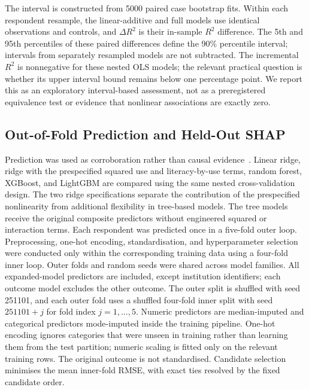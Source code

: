 \documentclass[sustainability,article,accept,moreauthors]{Definitions/mdpi}
\begin{document}
The interval is constructed from 5000 paired case bootstrap fits. Within each respondent resample, the linear-additive and full models use identical observations and controls, and $\Delta R^2$ is their in-sample $R^2$ difference. The 5th and 95th percentiles of these paired differences define the 90\% percentile interval; intervals from separately resampled models are not subtracted. The incremental $R^2$ is nonnegative for these nested OLS models; the relevant practical question is whether its upper interval bound remains below one percentage point. We report this as an exploratory interval-based assessment, not as a preregistered equivalence test or evidence that nonlinear associations are exactly zero.

\subsection{Out-of-Fold Prediction and Held-Out SHAP}\label{sec:predictionmethods}

Prediction was used as corroboration rather than causal evidence~\cite{yarkoni2017}. Linear ridge, ridge with the prespecified squared use and literacy-by-use terms, random forest, XGBoost, and LightGBM are compared using the same nested cross-validation design. The two ridge specifications separate the contribution of the prespecified nonlinearity from additional flexibility in tree-based models. The tree models receive the original composite predictors without engineered squared or interaction terms. Each respondent was predicted once in a five-fold outer loop. Preprocessing, one-hot encoding, standardisation, and hyperparameter selection were conducted only within the corresponding training data using a four-fold inner loop. Outer folds and random seeds were shared across model families. All expanded-model predictors are included, except institution identifiers; each outcome model excludes the other outcome. The outer split is shuffled with seed 251101, and each outer fold uses a shuffled four-fold inner split with seed $251101+j$ for fold index $j=1,\ldots,5$. Numeric predictors are median-imputed and categorical predictors mode-imputed inside the training pipeline. One-hot encoding ignores categories that were unseen in training rather than learning them from the test partition; numeric scaling is fitted only on the relevant training rows. The original outcome is not standardised. Candidate selection minimises the mean inner-fold RMSE, with exact ties resolved by the fixed candidate order.
\end{document}
